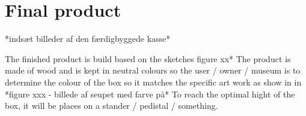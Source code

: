  \section{Final product }
*indsæt billeder af den færdigbyggede kasse* 

The finished product is build based on the sketches figure xx* The product is made of wood and is kept in neutral colours so the user / owner / museum is to determine the colour of the box so it matches the specific art work as show in in *figure xxx - billede af seupet med farve på* To reach the optimal hight of the box, it will be places on a stander / pedistal / something. 








